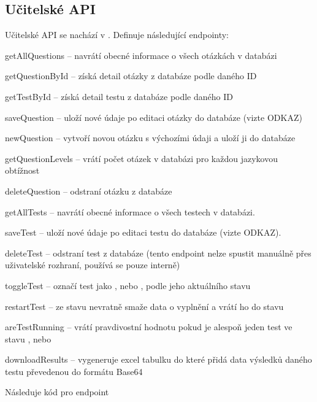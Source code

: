 \newpage
\subsection{Učitelské API}
\label{adminapi}

Učitelské API se nachází v . Definuje následující endpointy:

\begin{compactitem}
    \item getAllQuestions -- navrátí obecné informace o všech otázkách v databázi
    \item getQuestionById -- získá detail otázky z databáze podle daného ID
    \item getTestById -- získá detail testu z databáze podle daného ID
    \item saveQuestion -- uloží nové údaje po editaci otázky do databáze (vizte ODKAZ)
    \item newQuestion -- vytvoří novou otázku s výchozími údaji a uloží ji do databáze
    \item getQuestionLevels -- vrátí počet otázek v databázi pro každou jazykovou obtížnost
    \item deleteQuestion -- odstraní otázku z databáze
    \item getAllTests -- navrátí obecné informace o všech testech v databázi.
    \item saveTest -- uloží nové údaje po editaci testu do databáze (vizte ODKAZ).
    \item deleteTest -- odstraní test z databáze (tento endpoint nelze spustit manuálně přes uživatelské rozhraní, používá se pouze interně)
    \item toggleTest -- označí test jako , nebo , podle jeho aktuálního stavu
    \item restartTest -- ze stavu  nevratně smaže data o vyplnění a vrátí ho do stavu 
    \item areTestRunning -- vrátí pravdivostní hodnotu pokud je alespoň jeden test ve stavu , nebo 
    \item downloadResults -- vygeneruje excel tabulku do které přidá data výsledků daného testu převedenou do formátu Base64
\end{compactitem}

Následuje kód pro endpoint 


